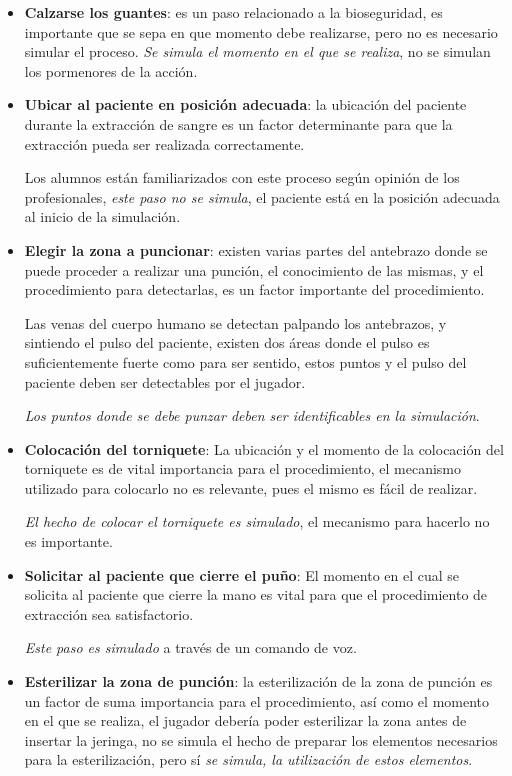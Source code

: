 \begin{itemize}
\item \textbf{Calzarse los guantes}: es un paso relacionado a la bioseguridad,
    es importante que se sepa en que momento debe realizarse, pero no es
    necesario simular el proceso. \emph{Se simula el momento en el
        que se realiza}, no se simulan los pormenores de la acción.

\item \textbf{Ubicar al paciente en posición adecuada}: la ubicación del
    paciente durante la extracción de sangre es un factor determinante para que
    la extracción pueda ser realizada correctamente.

    Los alumnos están familiarizados con este proceso según opinión de los
    profesionales, \emph{este paso no se simula}, el paciente está en la
    posición adecuada al inicio de la simulación.

\item \textbf{Elegir la zona a puncionar}: existen varias partes del antebrazo
    donde se puede proceder a realizar una punción, el conocimiento de las
    mismas, y el procedimiento para detectarlas, es un factor importante del
    procedimiento.
    
    Las venas del cuerpo humano se detectan palpando los antebrazos, y sintiendo
    el pulso del paciente, existen dos áreas donde el pulso es suficientemente
    fuerte como para ser sentido, estos puntos y el pulso del paciente deben ser
    detectables por el jugador.

    \emph{Los puntos donde se debe punzar deben ser identificables en la
        simulación}. 

\item \textbf{Colocación del torniquete}: La ubicación y el momento de la
    colocación del torniquete es de vital importancia para el procedimiento, el
    mecanismo utilizado para colocarlo no es relevante, pues el mismo es fácil
    de realizar.

    \emph{El hecho de colocar el torniquete es simulado}, el mecanismo para
    hacerlo no es importante.

\item \textbf{Solicitar al paciente que cierre el puño}: El momento en el cual
    se solicita al paciente que cierre la mano es vital para que el
    procedimiento de extracción sea satisfactorio.

    \emph{Este paso es simulado} a través de un comando de voz.

\item \textbf{Esterilizar la zona de punción}: la esterilización de la zona de
    punción es un factor de suma importancia para el procedimiento, así como el
    momento en el que se realiza, el jugador debería poder esterilizar la zona
    antes de insertar la jeringa, no se simula el hecho de preparar los
    elementos necesarios para la esterilización, pero sí \emph{se simula, la
        utilización de estos elementos}.
    

\end{itemize}
